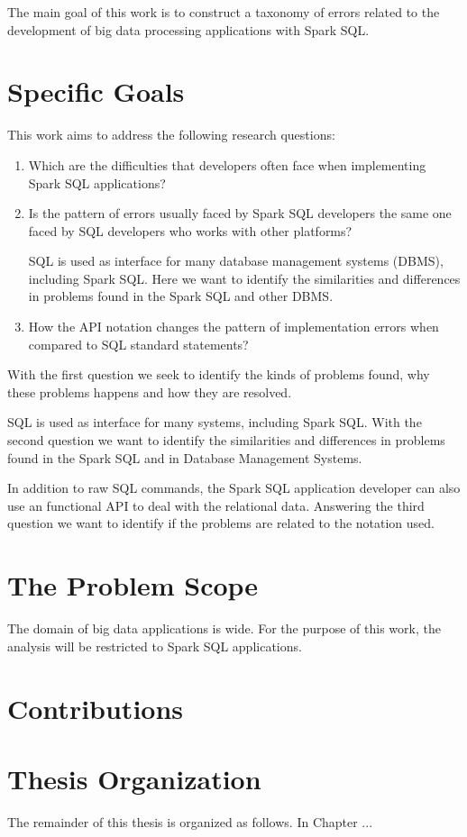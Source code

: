 The main goal of this work is to construct a taxonomy of errors related to the development of big data processing applications with Spark SQL.

\section{Specific Goals}

This work aims to address the following research questions:

\begin{enumerate}
    \item Which are the difficulties that developers often face when implementing Spark SQL applications?
    
    \item Is the pattern of errors usually faced by Spark SQL developers the same one faced by SQL developers who works with other platforms?
    
    SQL is used as interface for many database management systems (DBMS), including Spark SQL. Here we want to identify the similarities and differences in problems found in the Spark SQL and other DBMS. 
    
    \item How the API notation changes the pattern of implementation errors when compared to SQL standard statements?
    
\end{enumerate}

With the first question we seek to identify the kinds of problems found, why these problems happens and how they are resolved. 

SQL is used as interface for many systems, including Spark SQL. With the second question  we want to identify the similarities and differences in problems found in the Spark SQL and in Database Management Systems.

In addition to raw SQL commands, the Spark SQL application developer can also use an functional API to deal with the relational data. Answering the third question we want to identify if the problems are related to the notation used.
    
\section{The Problem Scope}

The domain of big data applications is wide. For the purpose of this work, the analysis will be restricted to Spark SQL applications.

\section{Contributions}

\section{Thesis Organization}

The remainder of this thesis is organized as follows. In Chapter ...